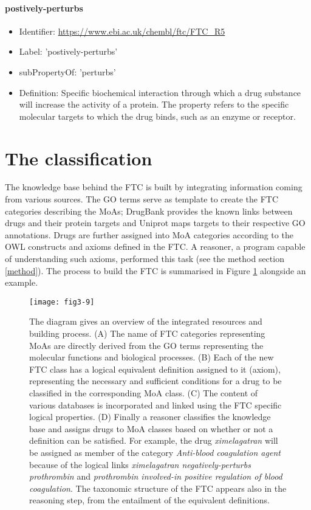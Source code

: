 \paragraph{postively-perturbs}
\begin{itemize}
  \item Identifier: \url{https://www.ebi.ac.uk/chembl/ftc/FTC\_R5}
  \item Label: 'postively-perturbs'
  \item subPropertyOf: 'perturbs'
  \item Definition: Specific biochemical interaction through which a drug substance will increase the activity of a protein. The property refers to the specific molecular targets to which the drug binds, such as an enzyme or receptor.
\end{itemize}

\section{The classification}
The knowledge base behind the FTC is built by integrating information coming from various sources. The GO terms serve as template to create the FTC categories describing the MoAs; DrugBank provides the known links between drugs and their protein targets and Uniprot  maps targets to their respective GO annotations. Drugs are further assigned into MoA categories according to the OWL constructs and axioms defined in the FTC. A reasoner, a program capable of understanding such axioms, performed this task (see the method section \ref{method}). The process to build the FTC is summarised in Figure \ref{fig3-9} alongside an example. 

\begin{figure}[H]
    \centering
    \texttt{[image: fig3-9]}
    \caption{The diagram gives an overview of the integrated resources and building process. (A) The name of FTC categories representing MoAs are directly derived from the GO terms representing the molecular functions and biological processes. (B) Each of the new FTC class has a logical equivalent definition assigned to it (axiom), representing the necessary and sufficient conditions for a drug to be classified in the corresponding MoA class. (C) The content of various databases is incorporated and linked using the FTC specific logical properties. (D) Finally a reasoner classifies the knowledge base and assigns drugs to MoA classes based on whether or not a definition can be satisfied. For example, the drug \emph{ximelagatran} will be assigned as member of the category \emph{Anti-blood coagulation agent} because of the logical links \emph{ximelagatran negatively-perturbs prothrombin} and \emph{prothrombin involved-in positive regulation of blood coagulation}. The taxonomic structure of the FTC appears also in the reasoning step, from the entailment of the equivalent definitions.}
    \label{fig3-9}
\end{figure}

